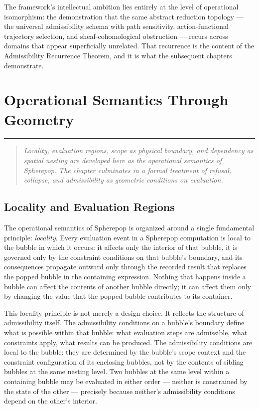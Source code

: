 \documentclass[12pt,openany]{book}
\theoremstyle{plain}
\theoremstyle{definition}
\theoremstyle{remark}
\newcommand{\chapterrule}{%
  \vspace{4pt}%
  {\color{SpherepopBlue}\rule{\textwidth}{0.8pt}}%
  \vspace{10pt}%
}
\newenvironment{chapterprecis}{%
  \begin{quote}\small\itshape}{%
  \end{quote}\medskip}
\begin{document}
The framework's intellectual ambition lies entirely at the level of operational isomorphism: the demonstration that the same abstract reduction topology — the universal admissibility schema with path sensitivity, action-functional trajectory selection, and sheaf-cohomological obstruction — recurs across domains that appear superficially unrelated. That recurrence is the content of the Admissibility Recurrence Theorem, and it is what the subsequent chapters demonstrate.

\chapter{Operational Semantics Through Geometry}
\chapterrule

\begin{chapterprecis}
Locality, evaluation regions, scope as physical boundary, and
dependency as spatial nesting are developed here as the
operational semantics of Spherepop. The chapter culminates in a
formal treatment of refusal, collapse, and admissibility as
geometric conditions on evaluation.
\end{chapterprecis}

\section{Locality and Evaluation Regions}

The operational semantics of Spherepop is organized around a single fundamental principle: \emph{locality}. Every evaluation event in a Spherepop computation is local to the bubble in which it occurs: it affects only the interior of that bubble, it is governed only by the constraint conditions on that bubble's boundary, and its consequences propagate outward only through the recorded result that replaces the popped bubble in the containing expression. Nothing that happens inside a bubble can affect the contents of another bubble directly; it can affect them only by changing the value that the popped bubble contributes to its container.

This locality principle is not merely a design choice. It reflects the structure of admissibility itself. The admissibility conditions on a bubble's boundary define what is possible within that bubble: what evaluation steps are admissible, what constraints apply, what results can be produced. The admissibility conditions are local to the bubble: they are determined by the bubble's scope context and the constraint configuration of its enclosing bubbles, not by the contents of sibling bubbles at the same nesting level. Two bubbles at the same level within a containing bubble may be evaluated in either order — neither is constrained by the state of the other — precisely because neither's admissibility conditions depend on the other's interior.
\end{document}

